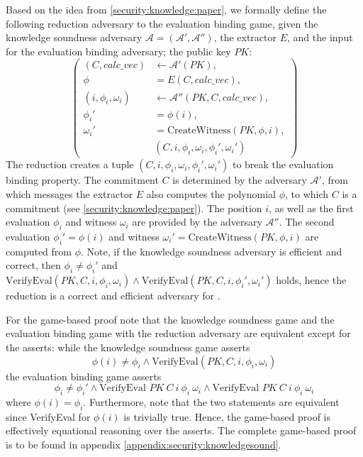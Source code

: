Based on the idea from \ref{security:knowledge:paper}, we formally define the following reduction adversary to the evaluation binding game, given the knowledge soundness adversary $\mathcal{A=(A',A'')}$, the extractor $E$, and the input for the evaluation binding adversary; the public key $PK$:
\begin{equation*}
    \left(
        \begin{aligned}
            (C,calc\_vec) &\leftarrow \mathcal{A'}(PK), \\
            \phi &= E(C, calc\_vec),\\
            (i, \phi_i, \omega_i) &\leftarrow \mathcal{A''}(PK, C, calc\_vec), \\
            \phi_i' &= \phi(i), \\
            \omega_i' &= \text{CreateWitness}(PK,\phi, i), \\
            &  (C, i, \phi_i, \omega_i, \phi_i', \omega_i')
        \end{aligned}
        \right)
\end{equation*}
The reduction creates a tuple $(C, i, \phi_i, \omega_i, \phi_i', \omega_i')$ to break the evaluation binding property. The commitment $C$ is determined by the adversary $\mathcal{A'}$, from which messages the extractor $E$ also computes the polynomial $\phi$, to which $C$ is a commitment (see \ref{security:knowledge:paper}). The position $i$, as well as the first evaluation $\phi_i$ and witness $\omega_i$ are provided by the adversary $\mathcal{A''}$. The second evaluation $\phi_i'=\phi(i)$ and witness $\omega_i'= \text{CreateWitness}(PK,\phi, i)$ are computed from $\phi$. Note, if the knowledge soundness adversary is efficient and correct, then $\phi_i\ne\phi_i'$ and $\text{VerifyEval}(PK,C,i,\phi_i,\omega_i) \land \text{VerifyEval}(PK,C,i,\phi_i',\omega_i')$ holds, hence the reduction is a correct and efficient adversary for . 

For the game-based proof note that the knowledge soundness game and the evaluation binding game with the reduction adversary are equivalent except for the asserts: while the knowledge soundness game asserts 
$$\phi(i) \ne \phi_i \land \text{VerifyEval}(PK, C, i,\phi_i,\omega_i)$$ the evaluation binding game asserts 
$$\phi_i \ne \phi_i' \land \text{VerifyEval } PK\ C\ i\ \phi_i\ \omega_i \land \text{VerifyEval } PK\ C\ i\ \phi_i\ \omega_i$$ where $\phi(i)=\phi_i$. Furthermore, note that the two statements are equivalent since VerifyEval for $\phi(i)$ is trivially true. Hence, the game-based proof is effectively equational reasoning over the asserts. The complete game-based proof is to be found in appendix \ref{appendix:security:knowledgesound}.

